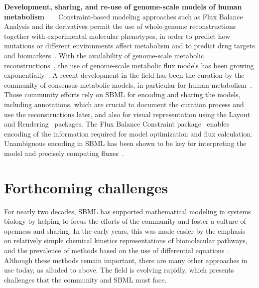 \documentclass[]{draft-sbml-paper}
\begin{document}
\textbf{Development, sharing, and re-use of genome-scale models of human metabolism}~~~~Constraint-based modeling approaches such as Flux Balance Analysis and its derivatives permit the use of whole-genome reconstructions together with experimental molecular phenotypes, in order to predict how mutations or different environments affect metabolism and to predict drug targets and biomarkers~\citep{savinell1992network, obrien2015}.  With the availability of genome-scale metabolic reconstructions~\citep{edwards1999systems}, the use of genome-scale metabolic flux models has been growing exponentially~\citep{Bordbar2014a}. A recent development in the field has been the curation by the community of consensus metabolic models, in particular for human metabolism~\citep{brunk2018}. Those community efforts rely on SBML for encoding and sharing the models, including annotations, which are crucial to document the curation process and use the reconstructions later, and also for visual representation using the Layout~\citep{Gauges2015} and Rendering~\citep{Bergmann2017} packages. The Flux Balance Constraint package~\citep{Olivier2018a} enables encoding of the information required for model optimization and flux calculation. Unambiguous encoding in SBML has been shown to be key for interpreting the model and precisely computing fluxes~\citep{Ebrahim2015}.

\hrulefill
\newpage

\section*{Forthcoming challenges}

For nearly two decades, SBML has supported mathematical modeling in systems biology by helping to focus the efforts of the community and foster a culture of openness and sharing. In the early years, this was made easier by the emphasis on relatively simple chemical kinetics representations of biomolecular pathways, and the prevalence of methods based on the use of differential equations~\citep{hubner2011applications}.  Although these methods remain important, there are many other approaches in use today, as alluded to above.  The field is evolving rapidly, which presents challenges that the community and SBML must face.

\end{document}
